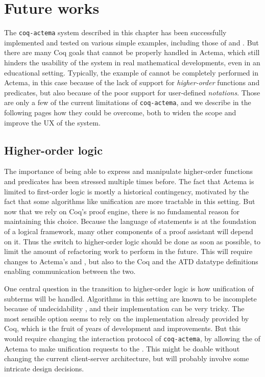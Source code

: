 \section{Future works}

The \texttt{coq-actema} system described in this chapter has been successfully
implemented and tested on various simple examples, including those of
 and . But there are many Coq goals that cannot be
properly handled in Actema, which still hinders the usability of the system in
real mathematical developments, even in an educational setting. Typically, the
example of  cannot be completely performed in Actema, in this case
because of the lack of support for \emph{higher-order} functions and predicates,
but also because of the poor support for user-defined \emph{notations}. Those
are only a few of the current limitations of \texttt{coq-actema}, and we
describe in the following pages how they could be overcome, both to widen the
scope and improve the UX of the system.

\subsection{Higher-order logic}

The importance of being able to express and manipulate higher-order functions
and predicates has been stressed multiple times before. The fact that Actema is
limited to first-order logic is mostly a historical contingency, motivated by
the fact that some algorithms like unification are more tractable in this
setting. But now that we rely on Coq's proof engine, there is no fundamental
reason for maintaining this choice. Because the language of statements is at the
foundation of a logical framework, many other components of a proof assistant
will depend on it. Thus the switch to higher-order logic should be done as soon
as possible, to limit the amount of refactoring work to perform in the future.
This will require changes to Actema's  and ,
but also to the Coq  and the ATD datatype definitions enabling
communication between the two.

One central question in the transition to higher-order logic is how unification
of subterms will be handled. Algorithms in this setting are known to be
incomplete because of undecidability , and
their implementation can be very tricky. The most sensible option seems to rely
on the implementation already provided by Coq, which is the fruit of years of
development and improvements. But this would require changing the interaction
protocol of \texttt{coq-actema}, by allowing the  of Actema to
make unification requests to the . This might be doable without
changing the current client-server architecture, but will probably involve some
intricate design decisions.

